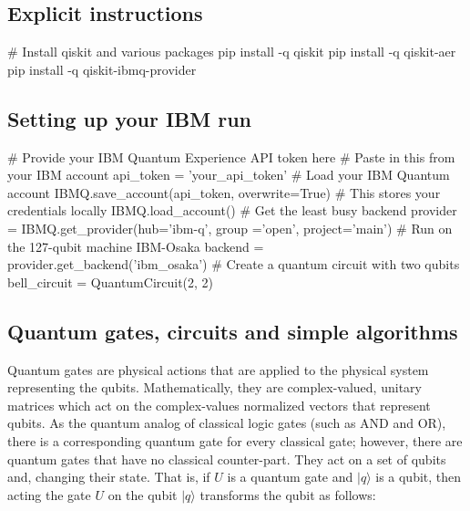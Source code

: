 \documentclass[%
oneside,                 %
final,                   %
10pt]{article}
\begin{document}
\subsection{Explicit instructions}






\bpycod
# Install qiskit and various packages
pip install -q qiskit
pip install -q qiskit-aer
pip install -q qiskit-ibmq-provider

\epycod


\subsection{Setting up your IBM run}













\bpycod
# Provide your IBM Quantum Experience API token here
# Paste in this from your IBM account
api_token = 'your_api_token'
# Load your IBM Quantum account
IBMQ.save_account(api_token, overwrite=True)  # This stores your credentials locally
IBMQ.load_account()
# Get the least busy backend
provider = IBMQ.get_provider(hub='ibm-q', group ='open', project='main')
# Run on the 127-qubit machine IBM-Osaka
backend = provider.get_backend('ibm_osaka')
# Create a quantum circuit with two qubits
bell_circuit = QuantumCircuit(2, 2)

\epycod


\subsection{Quantum gates, circuits and simple algorithms}

Quantum gates are physical actions that are applied to the physical
system representing the qubits. Mathematically, they are
complex-valued, unitary matrices which act on the complex-values
normalized vectors that represent qubits. As the quantum analog of
classical logic gates (such as AND and OR), there is a corresponding
quantum gate for every classical gate; however, there are quantum
gates that have no classical counter-part. They act on a set of qubits
and, changing their state. That is, if $U$ is a quantum gate and
$\vert q \rangle $ is a qubit, then acting the gate $U$ on the qubit $\vert q \rangle $
transforms the qubit as follows:
\end{document}
